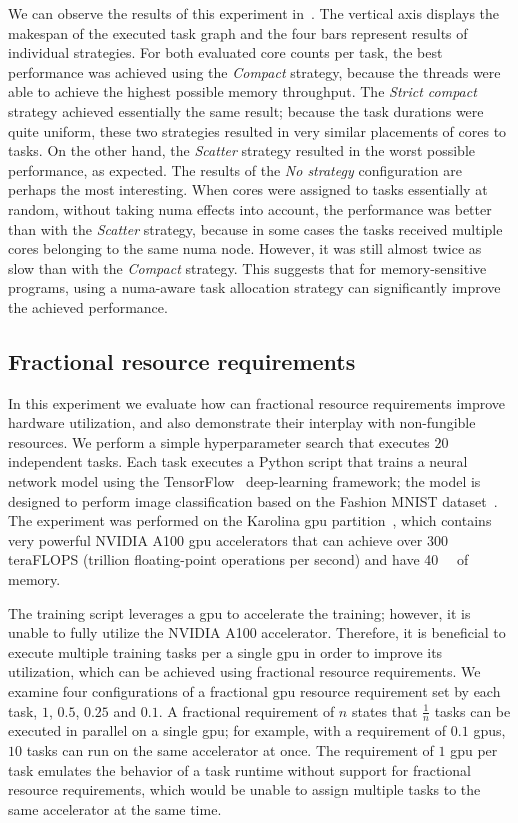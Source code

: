 We can observe the results of this experiment in~. The vertical axis displays
the makespan of the executed task graph and the four bars represent results of individual
strategies. For both evaluated core counts per task, the best performance was achieved using the
\emph{Compact} strategy, because the threads were able to achieve the highest possible
memory throughput. The \emph{Strict compact} strategy achieved essentially the same result;
because the task durations were quite uniform, these two strategies resulted in very similar
placements of cores to tasks. On the other hand, the \emph{Scatter} strategy resulted in
the worst possible performance, as expected. The results of the \emph{No strategy}
configuration are perhaps the most interesting. When cores were assigned to tasks essentially at
random, without taking \gls{numa} effects into account, the performance was better
than with the \emph{Scatter} strategy, because in some cases the tasks received multiple
cores belonging to the same \gls{numa} node. However, it was still almost twice as
slow than with the \emph{Compact} strategy. This suggests that for memory-sensitive
programs, using a \gls{numa}-aware task allocation strategy can significantly improve
the achieved performance.

\subsection{Fractional resource requirements}
\label{sec:hq-exp-fractional-resources}
In this experiment we evaluate how can fractional resource requirements improve hardware
utilization, and also demonstrate their interplay with non-fungible resources. We perform a
simple hyperparameter search that executes $20$ independent tasks. Each task executes a Python
script that trains a neural network model using the TensorFlow~\cite{tensorflow}
deep-learning framework; the model is designed to perform image classification based on the
Fashion MNIST dataset~\cite{fashionmnist}. The experiment was performed on the Karolina \gls{gpu}
partition~\cite{karolina_gpu}, which contains very powerful NVIDIA A100 \gls{gpu} accelerators
that can achieve over $300$ teraFLOPS (trillion floating-point operations per
second) and have \SI{40}{\gibi\byte} of memory.

The training script leverages a \gls{gpu} to accelerate the training; however, it is unable to
fully utilize the NVIDIA A100 accelerator. Therefore, it is beneficial to execute multiple
training tasks per a single \gls{gpu} in order to improve its utilization, which can be
achieved using fractional resource requirements. We examine four configurations of a fractional \gls{gpu}
resource requirement set by each task, $1$, $0.5$, $0.25$ and $0.1$.
A fractional requirement of $n$ states that $\frac{1}{n}$ tasks can be executed in parallel on a
single \gls{gpu}; for example, with a requirement of $0.1$ \glspl{gpu}, $10$ tasks can run on the
same accelerator at once. The requirement of $1$ \gls{gpu} per task emulates the behavior of a
task runtime without support for fractional resource requirements, which would be unable to
assign multiple tasks to the same accelerator at the same time.

